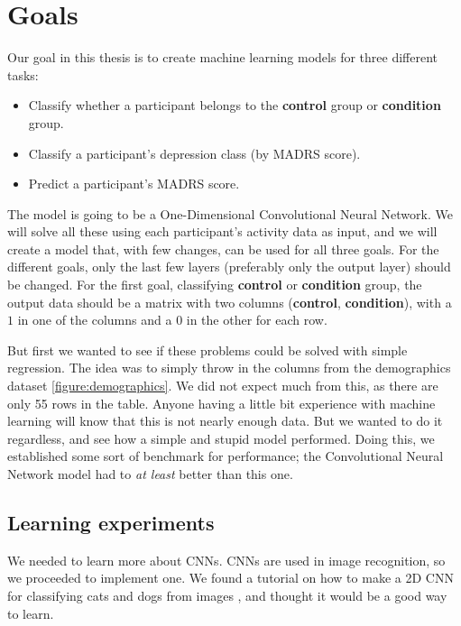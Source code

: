 \section{Goals}

Our goal in this thesis is to create machine learning models for three different tasks:

\begin{itemize}
  \item Classify whether a participant belongs to the \textbf{control} group or \textbf{condition} group.
  \item Classify a participant's depression class (by MADRS score).
  \item Predict a participant's MADRS score.
\end{itemize}

The model is going to be a One-Dimensional Convolutional Neural Network. 
We will solve all these using each participant's activity data as input, and we will create a model that, with few changes, can be used for all three goals.
For the different goals, only the last few layers (preferably only the output layer) should be changed. For the first goal, 
classifying \textbf{control} or \textbf{condition} group, the output data should be a matrix with two columns (\textbf{control}, \textbf{condition}), 
with a $1$ in one of the columns and a $0$ in the other for each row.

But first we wanted to see if these problems could be solved with simple regression. The idea was to simply throw in the columns from the 
demographics dataset \ref{figure:demographics}. We did not expect much from this, as there are only 55 rows in the table. Anyone having a little bit experience 
with machine learning will know that this is not nearly enough data. But we wanted to do it regardless, and see how a simple and stupid model performed.
Doing this, we established some sort of benchmark for performance; the Convolutional Neural Network model had to \textit{at least} better than this one.



\subsection{Learning experiments}

We needed to learn more about CNNs. CNNs are used in image recognition, so we proceeded to implement one. We found a tutorial on how to make 
a 2D CNN for classifying cats and dogs from images \cite{2d_cnn}, and thought it would be a good way to learn.

